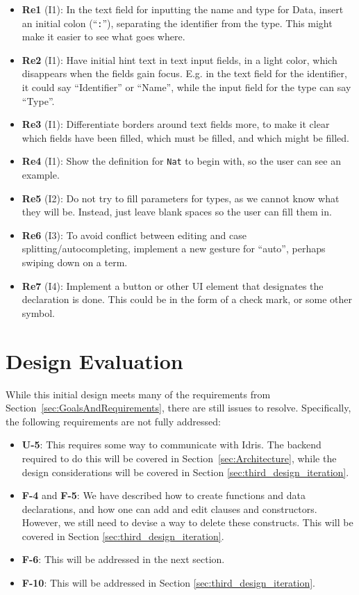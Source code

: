 \begin{itemize}
	\item \textbf{Re1} (I1): In the text field for inputting the name and type for Data, insert an initial colon (``\texttt{:}''), separating the identifier from the type. This might make it easier to see what goes where.
	\item \textbf{Re2} (I1): Have initial hint text in text input fields, in a light color, which disappears when the fields gain focus. E.g. in the text field for the identifier, it could say ``Identifier'' or ``Name'', while the input field for the type can say ``Type''.
	\item \textbf{Re3} (I1): Differentiate borders around text fields more, to make it clear which fields have been filled, which must be filled, and which might be filled.
	\item \textbf{Re4} (I1): Show the definition for \texttt{Nat} to begin with, so the user can see an example.
	\item \textbf{Re5} (I2): Do not try to fill parameters for types, as we cannot know what they will be. Instead, just leave blank spaces so the user can fill them in.
	\item \textbf{Re6} (I3): To avoid conflict between editing and case splitting/autocompleting, implement a new gesture for ``auto'', perhaps swiping down on a term.
	\item \textbf{Re7} (I4): Implement a button or other UI element that designates the declaration is done. This could be in the form of a check mark, or some other symbol.
\end{itemize}


\section{Design Evaluation}
\label{subsec:first_design_evaluation}
While this initial design meets many of the requirements from Section~\ref{sec:GoalsAndRequirements}, there are still issues to resolve.
Specifically, the following requirements are not fully addressed:
\begin{itemize}
	\item \textbf{U-5}: This requires some way to communicate with Idris. The backend required to do this will be covered in Section~\ref{sec:Architecture}, while the design considerations will be covered in
	Section \ref{sec:third_design_iteration}.
	\item \textbf{F-4} and \textbf{F-5}: We have described how to create functions and data declarations, and how one can add and edit clauses and constructors. However, we still need to devise a way to delete these constructs. This will be covered in Section \ref{sec:third_design_iteration}.
	\item \textbf{F-6}: This will be addressed in the next section.
	\item \textbf{F-10}: This will be addressed in Section \ref{sec:third_design_iteration}.
\end{itemize}

